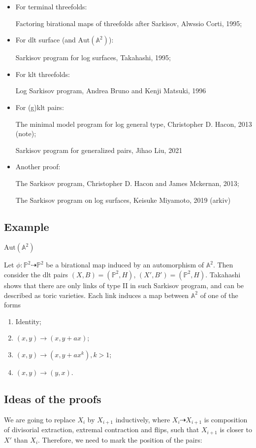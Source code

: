\documentclass{article}
\begin{document}
\begin{itemize}
  \item For terminal threefolds:

    Factoring birational maps of threefolds after Sarkisov, Alwssio Corti, 1995;
  \item For dlt surface (and $ \mathrm{Aut}(\mathbb{A}^2) $):

    Sarkisov program for log surfaces, Takahashi, 1995;
  \item For klt threefolds:

    Log Sarkisov program, Andrea Bruno and Kenji Matsuki, 1996
  \item For (g)klt pairs:

    The minimal model program for log general type, Christopher D. Hacon, 2013 (note);

    Sarkisov program for generalized pairs, Jihao Liu, 2021
  \item Another proof:

    The Sarkisov program, Christopher D. Hacon and James Mckernan, 2013;

    The Sarkisov program on log surfaces, Keisuke Miyamoto, 2019 (arkiv)
\end{itemize}
\subsection{Example}
$ \mathrm{Aut} (\mathbb{A}^2) $

Let $ \phi: \mathbb{P}^2\dashrightarrow\mathbb{P}^2 $ be a birational map induced by an automorphism of $ \mathbb{A}^2 $. Then consider the dlt pairs $ (X,B)=(\mathbb{P}^2,H) $, $ (X',B')=(\mathbb{P}^2,H) $. Takahashi shows that there are only links of type II in such Sarkisov program, and can be described as toric varieties. Each link induces a map between $ \mathbb{A}^2 $ of one of the forms
\begin{enumerate}
  \item Identity;
  \item $ (x,y)\to (x,y+ax) $;
  \item $ (x,y)\to (x,y+ax^k), k>1 $;
  \item $ (x,y)\to (y,x) $.
\end{enumerate}
\subsection{Ideas of the proofs}
We are going to replace $ X_i $ by $ X_{i+1} $ inductively, where $ X_i\dashrightarrow X_{i+1} $ is composition of divisorial extraction, extremal contraction and flips, such that $ X_{i+1} $ is closer to $ X' $ than $ X_i $. Therefore, we need to mark the position of the pairs:
\end{document}
